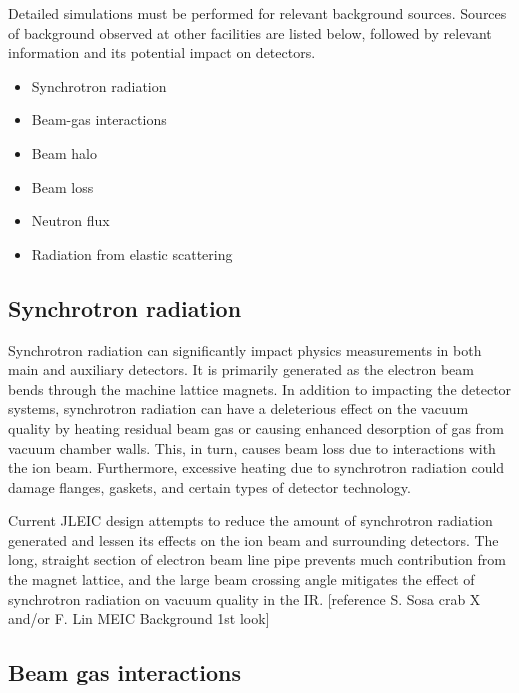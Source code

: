 
Detailed simulations must be performed for relevant background sources.  Sources of background observed at other facilities are listed below, followed by relevant information and its potential impact on detectors.
\begin{itemize}
	\item Synchrotron radiation
	\item Beam-gas interactions
	\item Beam halo
	\item Beam loss
	\item Neutron flux
	\item Radiation from elastic scattering
\end{itemize}

\subsection{Synchrotron radiation}

Synchrotron radiation can significantly impact physics measurements in both main and auxiliary detectors.  It is primarily generated as the electron beam bends through the machine lattice magnets.  In addition to impacting the detector systems, synchrotron radiation can have a deleterious effect on the vacuum quality by heating residual beam gas or causing enhanced desorption of gas from vacuum chamber walls.  This, in turn, causes beam loss due to interactions with the ion beam.  Furthermore, excessive heating due to synchrotron radiation could damage flanges, gaskets, and certain types of detector technology.

Current JLEIC design attempts to reduce the amount of synchrotron radiation generated and lessen its effects on the ion beam and surrounding detectors.  The long, straight section of electron beam line pipe prevents much contribution from the magnet lattice, and the large beam crossing angle mitigates the effect of synchrotron radiation on vacuum quality in the IR. [reference S. Sosa crab X and/or F. Lin MEIC Background 1st look]

\subsection{Beam gas interactions}

